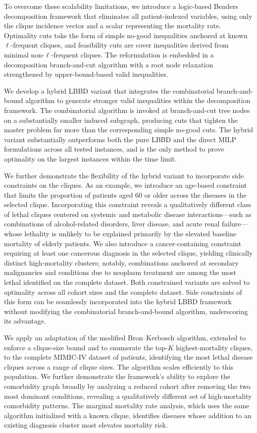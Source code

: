 To overcome these scalability limitations, we introduce a logic-based
Benders decomposition framework that eliminates all
patient-indexed variables, using only the clique incidence vector and
a scalar representing the mortality rate. Optimality cuts take the
form of simple no-good inequalities anchored at known $\ell$-frequent
cliques, and feasibility cuts are cover inequalities derived from
minimal non-$\ell$-frequent cliques. The reformulation is embedded in
a decomposition branch-and-cut algorithm with a root node relaxation
strengthened by upper-bound-based valid inequalities.

We develop a hybrid LBBD variant that integrates the combinatorial
branch-and-bound algorithm to generate stronger valid inequalities
within the decomposition framework. The combinatorial algorithm is
invoked at branch-and-cut tree nodes on a substantially smaller
induced subgraph, producing cuts that tighten the master problem far
more than the corresponding simple no-good cuts. The hybrid variant
substantially outperforms both the pure LBBD and the direct MILP
formulations across all tested instances, and is the only method to
prove optimality on the largest instances within the time limit.

We further demonstrate the flexibility of the hybrid variant to
incorporate side constraints on the cliques. As an example, we
introduce an age-based constraint that limits the proportion of
patients aged 60 or older across the diseases in the selected clique.
Incorporating this constraint reveals a qualitatively different class
of lethal cliques centered on systemic and metabolic disease
interactions---such as combinations of alcohol-related disorders, liver
disease, and acute renal failure---whose lethality is unlikely to be explained primarily by the elevated baseline mortality of elderly patients. We also introduce a cancer-containing constraint requiring at least one
cancerous diagnosis in the selected clique, yielding clinically
distinct high-mortality clusters; notably, combinations anchored at
secondary malignancies and conditions due to neoplasm treatment are
among the most lethal identified on the complete dataset. Both
constrained variants are solved to optimality across all cohort sizes
and the complete dataset. Side constraints of this form can be
seamlessly incorporated into the hybrid LBBD framework without
modifying the combinatorial branch-and-bound algorithm, underscoring
its advantage.

We apply an adaptation of the modified Bron--Kerbosch algorithm,
extended to enforce a clique-size bound and to enumerate the top-$K$
highest-mortality cliques, to the complete MIMIC-IV dataset of
 patients, identifying the most lethal disease
cliques across a range of clique sizes. The algorithm scales
efficiently to this population. We further demonstrate the
framework's ability to explore the comorbidity graph broadly by
analyzing a reduced cohort after removing the two most dominant
conditions, revealing a qualitatively different set of high-mortality
comorbidity patterns. The marginal mortality rate analysis, which uses
the same algorithm initialized with a known clique, identifies
diseases whose addition to an existing diagnosis cluster most elevates
mortality risk.

